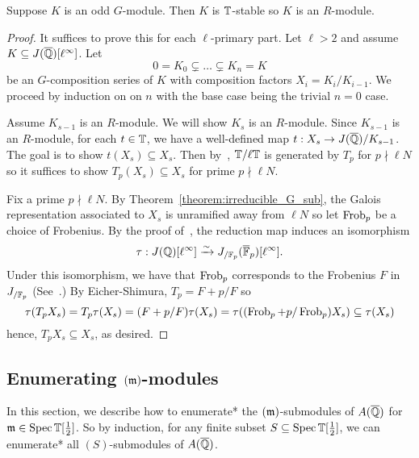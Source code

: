\documentclass{article}
\begin{document}
\begin{theorem}\label{theorem:G_modules_are_Hecke}
    Suppose $K$ is an odd $G$-module. Then $K$ is $\mathbb{T}$-stable so $K$ is
    an $R$-module.
\end{theorem}
\begin{proof}
    It suffices to prove this for each $\ell$-primary part. Let $\ell>2$ and
    assume $K\subseteq J(\overline{\mathbb{Q}})[\ell^\infty]$. Let
    \[
        0 = K_0 \subsetneq \ldots \subsetneq K_n = K
    \]
    be an $G$-composition series of $K$ with composition factors $X_i =
    K_i/K_{i-1}$. We proceed by induction on on $n$ with the base
    case being the trivial $n=0$ case. 
    
    Assume $K_{s-1}$ is an $R$-module. We will show $K_s$ is an $R$-module.
    Since $K_{s-1}$ is an $R$-module, for each $t\in \mathbb{T}$, we have a
    well-defined map $t:X_s\to J(\overline{\mathbb{Q}})/K_{s-1}$. The goal is to show
    $t(X_s)\subseteq X_s$. Then by~\cite[Proposition 2]{ribet:mult_p_finite},
    $\mathbb{T}/\ell \mathbb{T}$ is generated by $T_p$ for $p\nmid \ell N$ so it suffices to
    show $T_p(X_s)\subseteq X_s$ for prime $p\nmid \ell N$.

    Fix a prime $p\nmid \ell N$. By Theorem~\ref{theorem:irreducible_G_sub},
    the Galois representation associated to $X_s$ is unramified away from $\ell
    N$ so let $\operatorname{Frob}_p$ be a choice of Frobenius. By the proof of~\cite[Lemma
    12.6.2]{ribet-stein:mod}, the reduction map induces an isomorphism
    \[
        \tau:J(\mathbb{Q})[\ell^\infty] \xrightarrow{\sim} J_{/\mathbb{F}_p} (\overline{\mathbb{F}}_p)[\ell^\infty].
    \]
    Under this isomorphism, we have that $\operatorname{Frob}_p$ corresponds to the Frobenius
    $F$ in $J_{/\mathbb{F}_p}$ (See~\cite[\S 5.3]{ribet-stein:serre}.) By
    Eicher-Shimura, $T_p = F+p/F$ so
    \[
    \tau(T_p X_s) 
    = T_p\tau(X_s) 
    = (F+p/F)\tau(X_s)
    = \tau((\operatorname{Frob}_p+p/\operatorname{Frob}_p)X_s)
    \subseteq \tau(X_s)
    \]
    hence, $T_p X_s\subseteq X_s$, as desired.
\end{proof}

\subsection{Enumerating $(\mathfrak{m})$-modules}%
\label{sub:enumerating_m_modules}

In this section, we describe how to enumerate* the $(\mathfrak{m})$-submodules of
$A(\overline{\mathbb{Q}})$ for $\mathfrak{m}\in \operatorname{Spec} \mathbb{T}[\frac{1}{2}]$. So by induction, for any finite
subset $S\subseteq \operatorname{Spec} \mathbb{T}[\frac{1}{2}]$, we can enumerate* all
$(S)$-submodules of $A(\overline{\mathbb{Q}})$.
\end{document}

